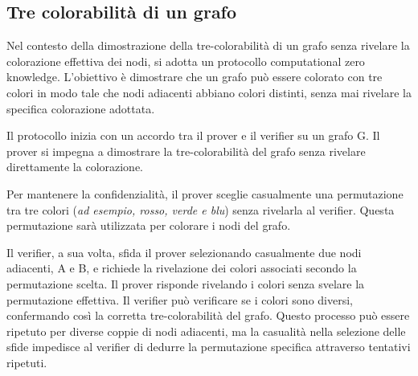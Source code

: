 \subsection{Tre colorabilità di un grafo}
\begin{figure}[H]
    \centering
\end{figure}
Nel contesto della dimostrazione della tre-colorabilità di un grafo senza rivelare la
colorazione effettiva dei nodi, si adotta un protocollo computational zero knowledge.
L'obiettivo è dimostrare che un grafo può essere colorato con tre colori in modo tale che
nodi adiacenti abbiano colori distinti, senza mai rivelare la specifica colorazione adottata.

Il protocollo inizia con un accordo tra il prover e il verifier su un grafo G. Il prover si
impegna a dimostrare la tre-colorabilità del grafo senza rivelare direttamente la colorazione.

Per mantenere la confidenzialità, il prover sceglie casualmente una permutazione tra tre colori
(\textit{ad esempio, rosso, verde e blu}) senza rivelarla al verifier. Questa permutazione sarà
utilizzata per colorare i nodi del grafo.

Il verifier, a sua volta, sfida il prover selezionando casualmente due nodi adiacenti, A e B,
e richiede la rivelazione dei colori associati secondo la permutazione scelta. Il prover risponde
rivelando i colori senza svelare la permutazione effettiva. Il verifier può verificare se i colori
sono diversi, confermando così la corretta tre-colorabilità del grafo.
Questo processo può essere ripetuto per diverse coppie di nodi adiacenti, ma la casualità nella
selezione delle sfide impedisce al verifier di dedurre la permutazione specifica attraverso tentativi
ripetuti.

